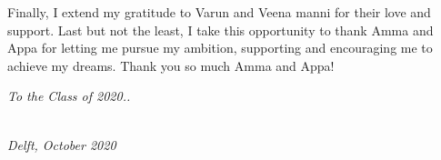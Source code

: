 Finally, I extend my gratitude to Varun and Veena manni for their love and support. Last but not the least, I take this opportunity to thank Amma and Appa for letting me pursue my ambition, supporting and encouraging me to achieve my dreams. Thank you so much Amma and Appa!   

\vspace{7mm}

\textit{To the Class of 2020..}


\begin{flushright}
{\makeatletter\itshape
    \@author \\
    Delft, October 2020
\makeatother}
\end{flushright}





 




